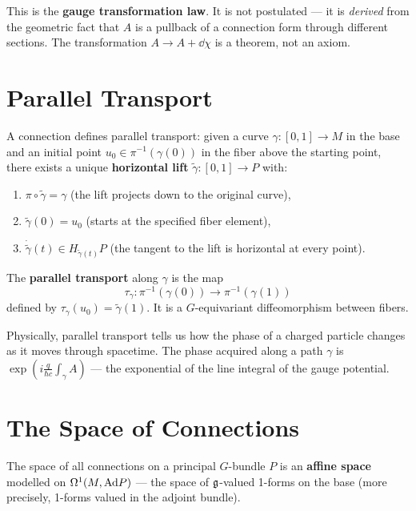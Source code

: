 This is the \textbf{gauge transformation law}. It is not postulated --- it is \emph{derived} from the geometric fact that $A$ is a pullback of a connection form through different sections. The transformation $A \to A + \dd\chi$ is a theorem, not an axiom.

\section{Parallel Transport}

A connection defines parallel transport: given a curve $\gamma: [0,1] \to M$ in the base and an initial point $u_0 \in \pi^{-1}(\gamma(0))$ in the fiber above the starting point, there exists a unique \textbf{horizontal lift} $\tilde{\gamma}: [0,1] \to P$ with:
\begin{enumerate}
\item $\pi \circ \tilde{\gamma} = \gamma$ (the lift projects down to the original curve),
\item $\tilde{\gamma}(0) = u_0$ (starts at the specified fiber element),
\item $\dot{\tilde{\gamma}}(t) \in H_{\tilde{\gamma}(t)}P$ (the tangent to the lift is horizontal at every point).
\end{enumerate}

\begin{definition}
The \textbf{parallel transport} along $\gamma$ is the map
\begin{equation}
\tau_\gamma: \pi^{-1}(\gamma(0)) \to \pi^{-1}(\gamma(1))
\end{equation}
defined by $\tau_\gamma(u_0) = \tilde{\gamma}(1)$. It is a $G$-equivariant diffeomorphism between fibers.
\end{definition}

Physically, parallel transport tells us how the phase of a charged particle changes as it moves through spacetime. The phase acquired along a path $\gamma$ is $\exp\!\left(i\frac{q}{\hbar c}\int_\gamma A\right)$ --- the exponential of the line integral of the gauge potential.

\section{The Space of Connections}

\begin{proposition}
The space of all connections on a principal $G$-bundle $P$ is an \textbf{affine space} modelled on $\Omega^1(M, \mathrm{Ad} P)$ --- the space of $\mathfrak{g}$-valued 1-forms on the base (more precisely, 1-forms valued in the adjoint bundle).
\end{proposition}

